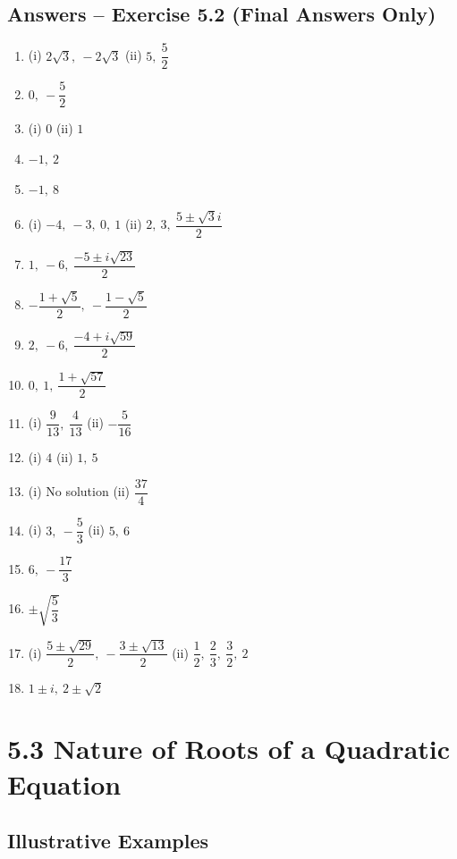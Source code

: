 \documentclass[12pt,a4paper]{article}
\begin{document}
\subsection{Answers -- Exercise 5.2 (Final Answers Only)}

\begin{enumerate}
    \item (i) \( 2\sqrt{3},\ -2\sqrt{3} \) \quad (ii) \( 5,\ \dfrac{5}{2} \)
    \item \( 0,\ -\dfrac{5}{2} \)
    \item (i) \( 0 \) \quad (ii) \( 1 \)
    \item \( -1,\ 2 \)
    \item \( -1,\ 8 \)
    \item (i) \( -4,\ -3,\ 0,\ 1 \) \quad (ii) \( 2,\ 3,\ \dfrac{5 \pm \sqrt{3}i}{2} \)
    \item \( 1,\ -6,\ \dfrac{-5 \pm i\sqrt{23}}{2} \)
    \item \( -\dfrac{1 + \sqrt{5}}{2},\ -\dfrac{1 - \sqrt{5}}{2} \)
    \item \( 2,\ -6,\ \dfrac{-4 + i\sqrt{59}}{2} \)
    \item \( 0,\ 1,\ \dfrac{1 + \sqrt{57}}{2} \)
    \item (i) \( \dfrac{9}{13},\ \dfrac{4}{13} \) \quad (ii) \( -\dfrac{5}{16} \)
    \item (i) \( 4 \) \quad (ii) \( 1,\ 5 \)
    \item (i) No solution \quad (ii) \( \dfrac{37}{4} \)
    \item (i) \( 3,\ -\dfrac{5}{3} \) \quad (ii) \( 5,\ 6 \)
    \item \( 6,\ -\dfrac{17}{3} \)
    \item \( \pm \sqrt{\dfrac{5}{3}} \)
    \item (i) \( \dfrac{5 \pm \sqrt{29}}{2},\ -\dfrac{3 \pm \sqrt{13}}{2} \) \quad (ii) \( \dfrac{1}{2},\ \dfrac{2}{3},\ \dfrac{3}{2},\ 2 \)
    \item \( 1 \pm i,\ 2 \pm \sqrt{2} \)
\end{enumerate}

\section{5.3 Nature of Roots of a Quadratic Equation}

\subsection{Illustrative Examples}
\end{document}
